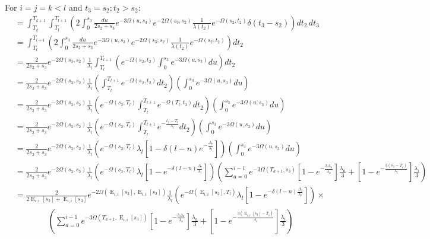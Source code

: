 \documentclass{article}
\DeclareMathOperator{\E}{E}
\begin{document}
For $i=j=k<l$ and $t_3=s_2;t_2>s_2$:
\begin{align*}
    &=\int_{T_k}^{T_{k+1}}\int_{T_l}^{T_{l+1}}\left(
    2\int_0^{s_3}\frac{du}{2s_2+s_3}e^{-3\Omega(u,s_3)}e^{-2\Omega(s_3,s_2)}\frac{1}{\lambda(t_2)}e^{-\Omega(s_2,t_2)}\delta(t_3-s_2)
    \right)dt_2\,dt_3\\
    &=\int_{T_l}^{T_{l+1}}\left(
    2\int_0^{s_3}\frac{du}{2s_2+s_3}e^{-3\Omega(u,s_3)}e^{-2\Omega(s_3,s_2)}\frac{1}{\lambda(t_2)}e^{-\Omega(s_2,t_2)}
    \right)dt_2\\
    &=\frac{2}{2s_2+s_3}e^{-2\Omega(s_3,s_2)}\frac{1}{\lambda_l}
    \int_{T_l}^{T_{l+1}}\left(
    e^{-\Omega(s_2,t_2)}\int_0^{s_3}e^{-3\Omega(u,s_3)}du
    \right)dt_2\\
    &=\frac{2}{2s_2+s_3}e^{-2\Omega(s_3,s_2)}\frac{1}{\lambda_l}
    \left(\int_{T_l}^{T_{l+1}}e^{-\Omega(s_2,t_2)}dt_2\right)
    \left(\int_0^{s_3}e^{-3\Omega(u,s_3)}du\right)\\
    &=\frac{2}{2s_2+s_3}e^{-2\Omega(s_3,s_2)}\frac{1}{\lambda_l}
    \left(e^{-\Omega(s_2,T_l)}\int_{T_l}^{T_{l+1}}e^{-\Omega(T_l,t_2)}dt_2\right)
    \left(\int_0^{s_3}e^{-3\Omega(u,s_3)}du\right)\\
    &=\frac{2}{2s_2+s_3}e^{-2\Omega(s_3,s_2)}\frac{1}{\lambda_l}
    \left(e^{-\Omega(s_2,T_l)}\int_{T_l}^{T_{l+1}}e^{-\frac{t_2-T_l}{\lambda_l}}dt_2\right)
    \left(\int_0^{s_3}e^{-3\Omega(u,s_3)}du\right)\\
    &=\frac{2}{2s_2+s_3}e^{-2\Omega(s_3,s_2)}\frac{1}{\lambda_l}
    \left(e^{-\Omega(s_2,T_l)}\lambda_l\left[1-\delta(l-n)e^{-\frac{\Delta_l}{\lambda_l}}\right]\right)
    \left(\int_0^{s_3}e^{-3\Omega(u,s_3)}du\right)\\
    &=\frac{2}{2s_2+s_3}e^{-2\Omega(s_3,s_2)}\frac{1}{\lambda_l}
    \left(e^{-\Omega(s_2,T_l)}\lambda_l\left[1-e^{-\delta(l-n)\frac{\Delta_l}{\lambda_l}}\right]\right)
    \left(\sum_{a=0}^{i-1} e^{-3\Omega(T_{a+1},s_3)}
    \left[1-e^{-\frac{3 \Delta_a}{\lambda_a}}\right]\frac{\lambda_a}{3}+
    \left[1-e^{-\frac{3 \left(s_3-T_{i}\right)}{\lambda_{i}}}\right]\frac{\lambda_{i}}{3}\right)\\
    &=\frac{2}{2\E_{i,i}[s_2]+\E_{i,i}[s_3]}e^{-2\Omega(\E_{i,i}[s_3],\E_{i,i}[s_2])}\frac{1}{\lambda_l}
    \left(e^{-\Omega(\E_{i,i}[s_2],T_l)}\lambda_l\left[1-e^{-\delta(l-n)\frac{\Delta_l}{\lambda_l}}\right]\right)\times\\
    &\qquad\qquad\left(\sum_{a=0}^{i-1} e^{-3\Omega(T_{a+1},\E_{i,i}[s_3])}
    \left[1-e^{-\frac{3 \Delta_a}{\lambda_a}}\right]\frac{\lambda_a}{3}+
    \left[1-e^{-\frac{3 \left(\E_{i,i}[s_3]-T_{i}\right)}{\lambda_{i}}}\right]\frac{\lambda_{i}}{3}\right)\\
    \\
\end{align*}
\end{document}
